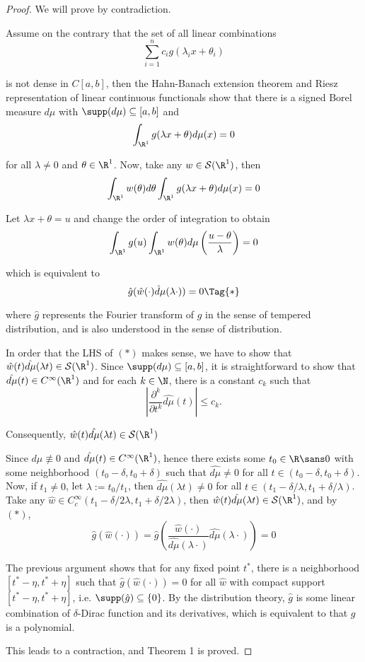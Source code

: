 \begin{proof}
  We will prove by contradiction.

  Assume on the contrary that the set of all linear combinations
  $$
    \sum_{i=1}^nc_ig(\lambda_ix+\theta_i)
  $$

  is not dense in $C[a,b]$, then the Hahn-Banach extension theorem and Riesz
  representation of linear continuous functionals show that there is a signed
  Borel measure $d\mu$ with $\supp(d\mu)\subseteq[a,b]$ and
  $$
    \int_{\R^1}g(\lambda x+\theta)d\mu(x)=0
  $$

  for all $\lambda\neq0$ and $\theta\in\R^1$. Now, take any $w\in\mathcal
  S(\R^1)$, then
  $$
    \int_{\R^1}w(\theta)d\theta\int_{\R^1}g(\lambda x+\theta)d\mu(x)=0
  $$

  Let $\lambda x+\theta=u$ and change the order of integration to obtain
  $$
    \int_{\R^1}g(u)\int_{\R^1}w(\theta)d\mu\left(\frac{u-\theta}\lambda\right)=0
  $$

  which is equivalent to
  \begin{equation*}
    \hat g(\hat w(\cdot)\hat d\mu(\lambda\cdot))=0\Tag{*}
  \end{equation*}

  where $\hat g$ represents the Fourier transform of $g$ in the sense of
  tempered distribution, and is also understood in the sense of distribution.

  In order that the LHS of $(*)$ makes sense, we have to show that $\hat
  w(t)\hat{d\mu}(\lambda t)\in\mathcal S(\R^1)$. Since
  $\supp(d\mu)\subseteq[a,b]$, it is straightforward to show that
  $\hat{d\mu}(t)\in C^\infty(\R^1)$ and for each $k\in\N$, there is a constant
  $c_k$ such that
  $$
    \left|\frac{\partial^k}{\partial t^k}\hat{d\mu}(t)\right|\leq c_k.
  $$

  Consequently, $\hat w(t)\hat{d\mu}(\lambda t)\in\mathcal S(\R^1)$

  Since $d\mu\not\equiv0$ and $\hat{d\mu}(t)\in C^\infty(\R^1)$, hence there
  exists some $t_0\in\R\sans0$ with some neighborhood $(t_0-\delta,t_0+\delta)$
  such that $\hat{d\mu}\neq0$ for all $t\in(t_0-\delta,t_0+\delta)$. Now, if
  $t_1\neq0$, let $\lambda:=t_0/t_1$, then $\hat{d\mu}(\lambda t)\neq0$ for all
  $t\in(t_1-\delta/\lambda,t_1+\delta/\lambda)$. Take any $\hat w\in
  C^\infty_c(t_1-\delta/2\lambda,t_1+\delta/2\lambda)$, then $\hat
  w(t)\hat{d\mu}(\lambda t)\in\mathcal S(\R^1)$, and by $(*)$,
  $$
    \hat g(\hat w(\cdot))=\hat g\left(\frac{\hat w(\cdot)}{\hat{d\mu}(\lambda\cdot)}\hat{d\mu}(\lambda\cdot)\right)=0
  $$

  The previous argument shows that for any fixed point $t^*$, there is a
  neighborhood $[t^*-\eta,t^*+\eta]$ such that $\hat g(\hat w(\cdot))=0$ for
  all $\hat w$ with compact support $[t^*-\eta,t^*+\eta]$, i.e. $\supp(\hat
  g)\subseteq\{0\}$. By the distribution theory, $\hat g$ is some linear
  combination of $\delta$-Dirac function and its derivatives, which is
  equivalent to that $g$ is a polynomial.

  This leads to a contraction, and Theorem 1 is proved.
\end{proof}

